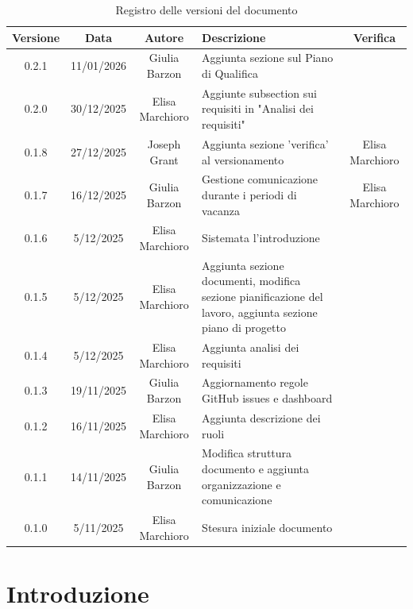 \documentclass[11pt,a4paper]{article}
\begin{document}
\begin{table}[H]
    \centering
    \begin{tabular}{|c|c|c|>{\raggedright\arraybackslash}p{}|c|}
        \hline
        \textbf{Versione} & \textbf{Data} & \textbf{Autore} & \textbf{Descrizione} & \textbf{Verifica} \\
        \hline
        0.2.1 & 11/01/2026 & Giulia Barzon & Aggiunta sezione sul Piano di Qualifica & \\
        \hline
        0.2.0 & 30/12/2025 & Elisa Marchioro & Aggiunte subsection sui requisiti in "Analisi dei requisiti" & \\ 
        \hline
        0.1.8 & 27/12/2025 & Joseph Grant & Aggiunta sezione 'verifica' al versionamento & Elisa Marchioro\\ 
        \hline
        0.1.7 & 16/12/2025 & Giulia Barzon & Gestione comunicazione durante i periodi di vacanza & Elisa Marchioro\\
        \hline
        0.1.6 & 5/12/2025 & Elisa Marchioro & Sistemata l'introduzione & \\
        \hline
        0.1.5 & 5/12/2025 & Elisa Marchioro & Aggiunta sezione documenti, modifica sezione pianificazione del lavoro, aggiunta sezione piano di progetto & \\
        \hline
        0.1.4 & 5/12/2025 & Elisa Marchioro & Aggiunta analisi dei requisiti & \\
        \hline
        0.1.3 & 19/11/2025 & Giulia Barzon & Aggiornamento regole GitHub issues e dashboard & \\
        \hline
        0.1.2 & 16/11/2025 & Elisa Marchioro & Aggiunta descrizione dei ruoli & \\
        \hline
        0.1.1 & 14/11/2025 & Giulia Barzon & Modifica struttura documento e aggiunta organizzazione e comunicazione & \\
        \hline
        0.1.0 & 5/11/2025 & Elisa Marchioro & Stesura iniziale documento & \\
        \hline
    \end{tabular}
    \caption{Registro delle versioni del documento}
    \label{tab:versionamento}
\end{table}

\newpage

\tableofcontents
\newpage

\section{Introduzione}
\end{document}
